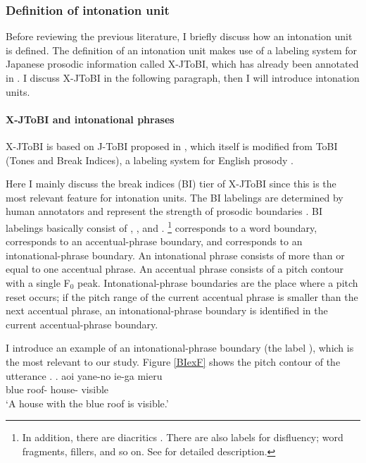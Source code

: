 \subsubsection{Definition of intonation unit}

Before reviewing the previous literature,
I briefly discuss how an intonation unit is defined.
The definition of an intonation unit makes use of a labeling system for Japanese prosodic information called X-JToBI,
which has already been annotated in .
I discuss X-JToBI in the following paragraph, then I will introduce intonation units.

\paragraph{X-JToBI and intonational phrases}

X-JToBI \cite{maekawaetal02,igarashietal06} is based on J-ToBI proposed in ,
which itself is modified from ToBI (Tones and Break Indices), a labeling system for English prosody \cite{silvermanetal92,pitrellietal94,beckmanelam97}.%

Here I mainly discuss the break indices (BI) tier of X-JToBI
since this is the most relevant feature for intonation units.
The BI labelings are determined by human annotators and represent the strength of prosodic boundaries \cite{maekawaetal02,igarashietal06}.
BI labelings basically consist of , , and .%
	\footnote{
	In addition, there are diacritics .
	There are also labels for disfluency;
	word fragments, fillers, and so on.
	See  for detailed description.
	}
 corresponds to a word boundary,
 corresponds to an accentual-phrase boundary, and
 corresponds to an intonational-phrase boundary.
An intonational phrase consists of more than or equal to one accentual phrase.
An accentual phrase consists of a pitch contour with a single F$_{0}$ peak.
Intonational-phrase boundaries are the place where a pitch reset occurs;
if the pitch range of the current accentual phrase is smaller than the next accentual phrase,
an intonational-phrase boundary is identified in the current accentual-phrase boundary.

I introduce an example of an intonational-phrase boundary (the label ),
which is the most relevant to our study.
Figure \ref{BIexF} shows the pitch contour of the utterance \Next.
%
\exg. aoi yane-no ie-ga mieru \\
	blue roof- house- visible \\
	`A house with the blue roof is visible.'


